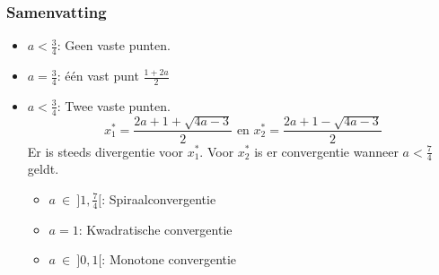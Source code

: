 \documentclass[examenvragen.tex]{subfiles}
\begin{document}
\subsubsection{Samenvatting}
\begin{itemize}
\item $a < \frac{3}{4}$: Geen vaste punten.
\item $a = \frac{3}{4}$: \'e\'en vast punt $\frac{1+2a}{2}$
\item $a < \frac{3}{4}$: Twee vaste punten.
\[
x^{*}_1 = \frac{2a+1 +\sqrt{4a-3}}{2} \text{ en } x^{*}_{2}= \frac{2a+1 -\sqrt{4a-3}}{2}
\]
Er is steeds divergentie voor $x^{*}_1$. 
Voor $x^{*}_{2}$ is er convergentie wanneer $a< \frac{7}{4}$ geldt.
\begin{itemize}
\item $a \ \in\  ]1,\frac{7}{4}[$: Spiraalconvergentie
\item $a=1$: Kwadratische convergentie
\item $a\ \in\ ]0,1[$: Monotone convergentie
\end{itemize} 
\end{itemize}
\end{document}
